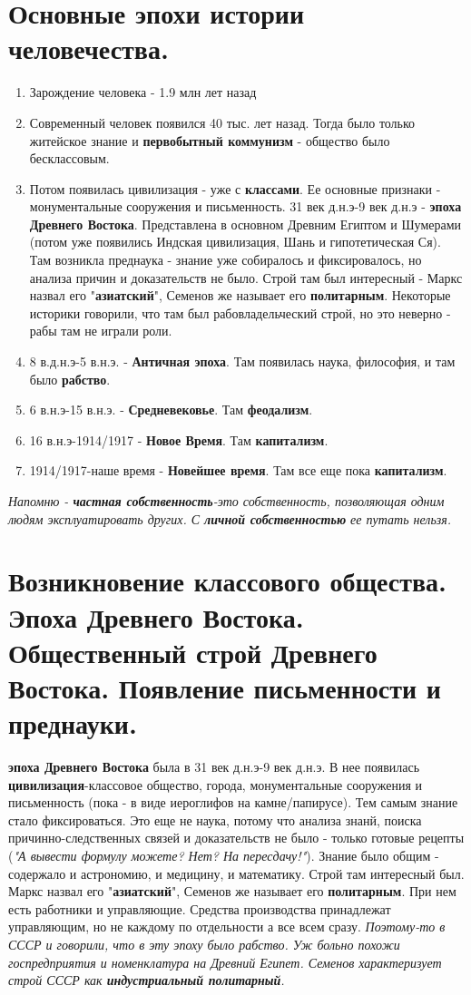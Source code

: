 \documentclass[12pt,a4paper]{article}
\begin{document}
\section{Основные эпохи истории человечества.}
\begin{enumerate}
\item Зарождение человека - 1.9 млн лет назад
\item Современный человек появился 40 тыс. лет назад.
Тогда было только житейское знание и \textbf{первобытный коммунизм} - общество было бесклассовым.
\item Потом появилась цивилизация  - уже с \textbf{классами}. Ее основные признаки - монументальные сооружения и письменность.
31 век д.н.э-9 век д.н.э - \textbf{эпоха Древнего Востока}. Представлена в основном Древним Египтом и Шумерами (потом уже появились Индская цивилизация, Шань и гипотетическая Ся).
Там возникла преднаука - знание уже собиралось и фиксировалось, но анализа причин и доказательств не было.
Строй там был интересный - Маркс назвал его "\textbf{азиатский}", Семенов же называет его \textbf{политарным}. Некоторые историки говорили, что там был рабовладельческий строй, но это неверно - рабы там не играли роли.
\item 8 в.д.н.э-5 в.н.э. - \textbf{Античная эпоха}. Там появилась наука, философия, и там было \textbf{рабство}.
\item 6 в.н.э-15 в.н.э. - \textbf{Средневековье}. Там \textbf{феодализм}.
\item 16 в.н.э-1914/1917 - \textbf{Новое Время}. Там \textbf{капитализм}.
\item 1914/1917-наше время - \textbf{Новейшее время}. Там все еще пока \textbf{капитализм}.
\end{enumerate}
\textit{Напомню - \textbf{частная собственность}-это собственность, позволяющая одним людям эксплуатировать других. С \textbf{личной собственностью} ее путать нельзя.}

\section{Возникновение классового общества. Эпоха Древнего Востока. Общественный строй Древнего Востока. Появление письменности и преднауки.}
\textbf{эпоха Древнего Востока} была в 31 век д.н.э-9 век д.н.э. В нее появилась \textbf{цивилизация}-классовое общество, города, монументальные сооружения и письменность (пока - в виде иероглифов на камне/папирусе). Тем самым знание стало фиксироваться. Это еще не наука, потому что анализа знанй, поиска причинно-следственных связей и доказательств не было - только готовые рецепты (\textit{"А вывести формулу можете? Нет? На пересдачу!"}). Знание было общим - содержало и астрономию, и медицину, и математику. Строй там интересный был. Маркс назвал его "\textbf{азиатский}", Семенов же называет его \textbf{политарным}. При нем есть работники и управляющие. Средства производства принадлежат управляющим, но не каждому по отдельности а все всем сразу. \textit{Поэтому-то в СССР и говорили, что в эту эпоху было рабство. Уж больно похожи госпредприятия и номенклатура на Древний Египет. Семенов характеризует строй СССР как \textbf{индустриальный политарный}.}
\end{document}
